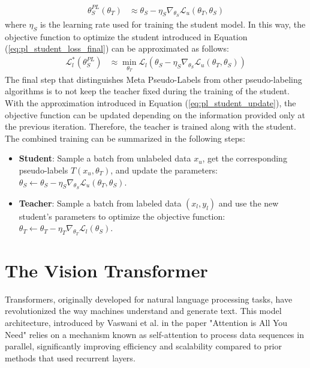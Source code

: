 \begin{align}
    \theta_S^{PL}(\theta_T) &\approx \theta_S - \eta_S \nabla_{\theta_S} \mathcal{L}_u(\theta_T, \theta_S)
    \label{eq:pl_student_update}
\end{align}
where $\eta_S$ is the learning rate used for training the student model.
In this way, the objective function to optimize the student introduced in 
Equation (\ref{eq:pl_student_loss_final}) can be approximated as follows:
\begin{align}
    \mathcal{L}^*_l(\theta_S^{PL}) &\approx \min_{\theta_T} \mathcal{L}_l(\theta_S - \eta_S \nabla_{\theta_S} \mathcal{L}_u(\theta_T, \theta_S))
    \label{eq:pl_student_loss_final_approx}
\end{align}
The final step that distinguishes Meta Pseudo-Labels from other pseudo-labeling 
algorithms is to not keep the teacher fixed during the training of the student. 
With the approximation introduced in Equation (\ref{eq:pl_student_update}), 
the objective function can be updated depending on the information provided only 
at the previous iteration.
Therefore, the teacher is trained along with the student.
The combined training can be summarized in the following steps:

\begin{itemize}
    \item \textbf{Student}: Sample a batch from unlabeled data $x_u$, get the 
    corresponding pseudo-labels $T(x_u, \theta_T)$, and update the parameters: 
    $\theta_S \leftarrow \theta_S - \eta_S \nabla_{\theta_S} \mathcal{L}_u(\theta_T, \theta_S)$.
    \item \textbf{Teacher}: Sample a batch from labeled data $(x_l, y_l)$ and 
    use the new student's parameters to optimize the objective function:
    $\theta_T \leftarrow \theta_T - \eta_T \nabla_{\theta_T} \mathcal{L}_l(\theta_S)$.
\end{itemize}


\section{The Vision Transformer}

Transformers, originally developed for natural language processing tasks, have 
revolutionized the way machines understand and generate text. 
This model architecture, introduced by Vaswani et al. in the paper 
"Attention is All You Need" \cite{attention_is_all_you_need} relies on a 
mechanism known as self-attention to 
process data sequences in parallel, significantly improving efficiency and 
scalability compared to prior methods that used recurrent layers.

